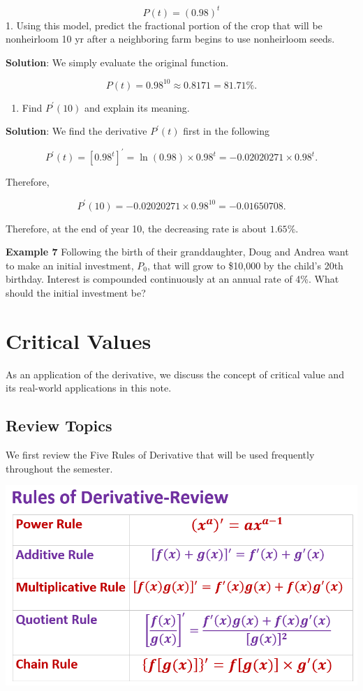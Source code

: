 \documentclass[
]{book}
\providecommand{\tightlist}{%
  \setlength{\itemsep}{0pt}\setlength{\parskip}{0pt}}
\begin{document}
\[
P(t) = (0.98)^t
\]
1. Using this model, predict the fractional portion of the crop that will be nonheirloom 10 yr after a neighboring farm begins to use nonheirloom seeds.

\textbf{Solution}: We simply evaluate the original function.

\[
P(t) = 0.98^{10} \approx 0.8171 = 81.71\%.
\]

\begin{enumerate}
\def\labelenumi{\arabic{enumi}.}
\setcounter{enumi}{1}
\tightlist
\item
  Find \(P^\prime(10)\) and explain its meaning.
\end{enumerate}

\textbf{Solution}: We find the derivative \(P^\prime(t)\) first in the following

\[
P^\prime(t) = [0.98^t]^\prime = \ln(0.98)\times 0.98^t = -0.02020271\times 0.98^t.
\]

Therefore,

\[
P^\prime(10) = -0.02020271\times 0.98^{10} =  -0.01650708.
\]

Therefore, at the end of year 10, the decreasing rate is about \(1.65\%\).

\textbf{Example 7} Following the birth of their granddaughter, Doug and Andrea want to make an initial investment, \(P_0\), that will grow to \$10,000 by the child's 20th birthday. Interest is compounded continuously at an annual rate of 4\%. What should the initial investment be?

\hypertarget{critical-values}{%
\chapter{Critical Values}\label{critical-values}}

As an application of the derivative, we discuss the concept of critical value and its real-world applications in this note.

\hypertarget{review-topics-2}{%
\section{Review Topics}\label{review-topics-2}}

We first review the Five Rules of Derivative that will be used frequently throughout the semester.

\begin{center}\includegraphics[width=0.8\linewidth]{img07/w07-RuleDerivatives} \end{center}
\end{document}
